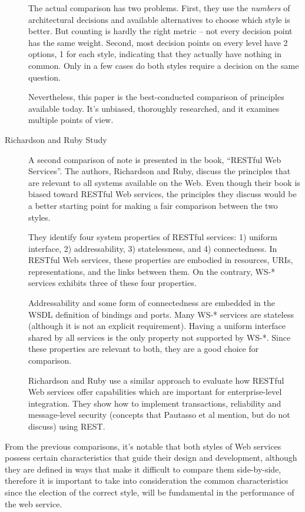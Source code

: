 \begin{description}
The actual comparison has two problems. First, they use the \emph{numbers} of architectural decisions and available alternatives to choose which style is better. But counting is hardly the right metric -- not every decision point has the same weight. Second, most decision points on every level have 2 options, 1 for each style, indicating that they actually have nothing in common. Only in a few cases do both styles require a decision on the same question.

Nevertheless, this paper is the best-conducted comparison of principles available today. It's unbiased, thoroughly researched, and it examines multiple points of view.

\item[Richardson and Ruby Study] A second comparison of note is presented in the book, ``RESTful Web Services''\cite{RichardsonRuby:2007}. The authors, Richardson and Ruby, discuss the principles that are relevant to all systems available on the Web. Even though their book is biased toward RESTful Web services, the principles they discuss would be a better starting point for making a fair comparison between the two styles.

They identify four system properties of RESTful services: 1) uniform interface, 2) addressability, 3) statelessness, and 4) connectedness. In RESTful Web services, these properties are embodied in resources, URIs, representations, and the links between them. On the contrary, WS-* services exhibits three of these four properties.

Addressability and some form of connectedness are embedded in the WSDL definition of bindings and ports. Many WS-* services are stateless (although it is not an explicit requirement). Having a uniform interface shared by all services is the only property not supported by WS-*. Since these properties are relevant to both, they are a good choice for comparison.

Richardson and Ruby use a similar approach to evaluate how RESTful Web services offer capabilities which are important for enterprise-level integration. They show how to implement transactions, reliability and message-level security (concepts that Pautasso et al mention, but do not discuss) using REST.
\end{description}

From the previous comparisons, it's notable that both styles of Web services possess certain characteristics that guide their design and development, although they are defined in ways that make it difficult to compare them side-by-side, therefore it is important to take into consideration the common characteristics since the election of the correct style, will be fundamental in the performance of the web service.

